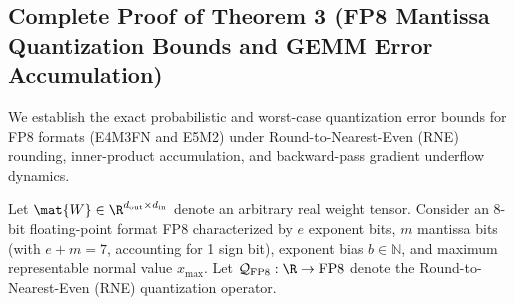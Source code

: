 \subsection{Complete Proof of Theorem 3 (FP8 Mantissa Quantization Bounds and GEMM Error Accumulation)}
\label{sec:appendix_a3_thm3}

We establish the exact probabilistic and worst-case quantization error bounds for FP8 formats (E4M3FN and E5M2) under Round-to-Nearest-Even (RNE) rounding, inner-product accumulation, and backward-pass gradient underflow dynamics.

\begin{theorem}
\label{thm:fp8_mantissa_bound}
Let $\mat{W} \in \R^{d_{\text{out}} \times d_{\text{in}}}$ denote an arbitrary real weight tensor. Consider an 8-bit floating-point format FP8 characterized by $e$ exponent bits, $m$ mantissa bits (with $e + m = 7$, accounting for 1 sign bit), exponent bias $b \in \mathbb{N}$, and maximum representable normal value $x_{\max}$.
Let $\mathcal{Q}_{\text{FP8}}: \R \to \text{FP8}$ denote the Round-to-Nearest-Even (RNE) quantization operator.


\end{theorem}
